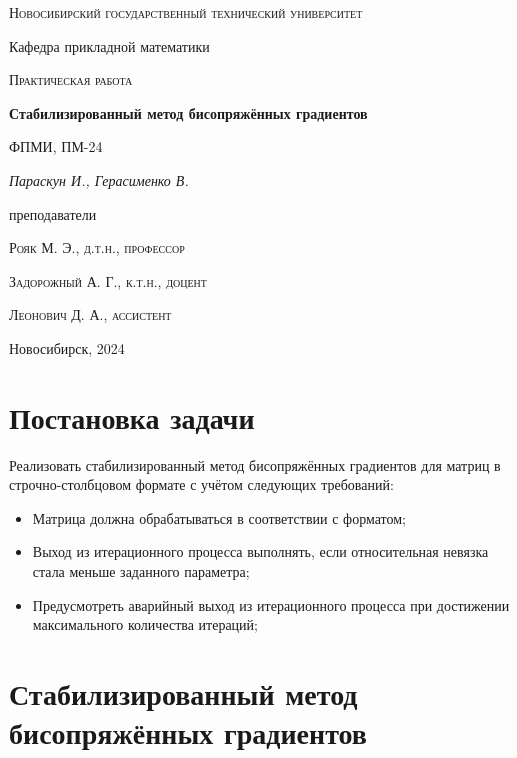 \documentclass[12pt, a4paper]{article}
\begin{document}
\begin{titlepage}
  \centering
  \textsc{Новосибирский государственный технический университет}\par
  \vspace{1mm}
  Кафедра прикладной математики\par
  \vspace{4cm}
  \textsc{Практическая работа }\par
  {\huge\bfseries Стабилизированный метод бисопряжённых градиентов\par}
  \vspace{1cm}
  {\scriptsize ФПМИ, ПМ-24\par}
  \vspace{1mm}
  {\itshape\large Параскун И., Герасименко В.\par}
  \vfill
  {\small преподаватели\par}
  \vspace{2mm}
  \textsc{Рояк М. Э., д.т.н., профессор}\par
  \vspace{1mm}
  \textsc{Задорожный А. Г., к.т.н., доцент}\par
  \vspace{1mm}
  \textsc{Леонович Д. А., ассистент}\par
  \vfill
  \large{Новосибирск, 2024}
\end{titlepage}

\newpage

\setcounter{page}{2}
\tableofcontents

\newpage

\section{Постановка задачи}
Реализовать стабилизированный метод бисопряжённых градиентов для матриц в строчно-столбцовом 
формате с учётом следующих требований:

\begin{itemize}
  \item Матрица должна обрабатываться в соответствии с форматом;
  \item Выход из итерационного процесса выполнять, если относительная 
    невязка стала меньше заданного параметра;
  \item Предусмотреть аварийный выход из итерационного процесса при достижении 
    максимального количества итераций;
\end{itemize}

\section{Стабилизированный метод бисопряжённых градиентов}
\end{document}

